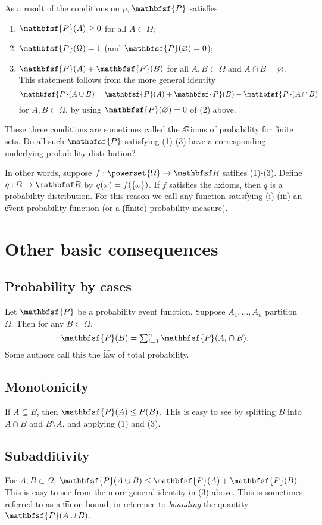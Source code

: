 As a result of the conditions on $p$, $\mathbfsf{P} $ satisfies
    \begin{enumerate}
      \item $\mathbfsf{P} (A) \geq 0$ for all $A \subset \Omega $;
      \item $\mathbfsf{P} (\Omega ) = 1$ (and $\mathbfsf{P} (\varnothing) = 0$);
      \item $\mathbfsf{P} (A) + \mathbfsf{P} (B)$ for all $A, B \subset \Omega $ and $A \cap  B = \varnothing$.
This statement follows from the more general identity
          \[
\mathbfsf{P} (A \cup B) = \mathbfsf{P} (A) + \mathbfsf{P} (B) - \mathbfsf{P} (A \cap  B)
          \]
for $A, B \subset \Omega $, by using $\mathbfsf{P} (\varnothing) = 0$ of (2) above.
    \end{enumerate}

These three conditions are sometimes called the \t{axioms of probability for finite sets}.
Do all such $\mathbfsf{P} $ satisfying (1)-(3) have a corresponding underlying probability distribution?

In other words, suppose $f: \powerset{\Omega } \to \R $ satifies (1)-(3).
Define $q: \Omega  \to \R $ by $q(\omega ) = f(\{\omega \})$.
If $f$ satisfies the axioms, then $q$ is a probability distribution.
For this reason we call any function satisfying (i)-(iii) an \t{event probability function} (or a \t{(finite) probability measure}).

\section*{Other basic consequences}

\subsection*{Probability by cases}

Let $\mathbfsf{P} $ be a probability event function.
Suppose $A_1, \dots , A_n$ partition $\Omega $.
Then for any $B \subset \Omega $,
    \[
\textstyle
\mathbfsf{P} (B) = \sum_{i = 1}^{n} \mathbfsf{P} (A_i \cap  B).
    \]
Some authors call this the \t{law of total probability}.

\subsection*{Monotonicity}

If $A \subseteq B$, then $\mathbfsf{P} (A) \leq P(B)$.
This is easy to see by splitting $B$ into $A \cap  B$ and $B \setminus A$, and applying (1) and (3).

\subsection*{Subadditivity}

For $A, B \subset \Omega $, $\mathbfsf{P} (A \cup B) \leq \mathbfsf{P} (A) + \mathbfsf{P} (B)$.
This is easy to see from the more general identity in (3) above.
This is sometimes referred to as a \t{union bound}, in reference to \textit{bounding} the quantity $\mathbfsf{P} (A \cup B)$.
